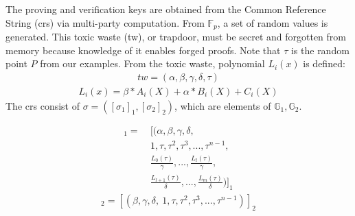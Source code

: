 The proving and verification keys are obtained from the Common Reference String (\acrshort{crs}) via multi-party computation. From \begin{math}\mathbb{F}_p\end{math}, a set of random values is generated. This toxic waste (tw), or trapdoor, must be secret and forgotten from memory because knowledge of it enables forged proofs. Note that \begin{math}\tau\end{math} is the random point \(P\) from our examples. From the toxic waste, polynomial \(L_i(x)\) is defined:
\begin{align}
    tw = (\alpha, \beta, \gamma, \delta, \tau) 
\end{align}
\begin{align*}
    L_i(x) = \beta * A_i(X) + \alpha * B_i(X) + C_i(X)
\end{align*}
The \acrshort{crs} consist of \begin{math} \sigma = ([\sigma_1]_1,[\sigma_2]_2)\end{math}, which are elements of \begin{math} \mathbb{G}_1, \mathbb{G}_2\end{math}.

\begin{align}
    [\sigma_1]_1 = 
    &\ [(\alpha, \beta, \gamma, \delta, \\
    &\ 1, \tau, \tau^2, \tau^3, ..., \tau^{n-1}, \\
    &\ \frac{L_0(\tau)}{\gamma}, ..., \frac{L_l(\tau)}{\gamma}, \\
    &\ \frac{L_{l+1}(\tau)}{\delta}, ..., \frac{L_m(\tau)}{\delta})]_1 
\end{align}
\begin{align*}
    [\sigma_2]_2 = [(\beta, \gamma, \delta, \ 1, \tau, \tau^2, \tau^3, ..., \tau^{n-1})]_2
\end{align*}

